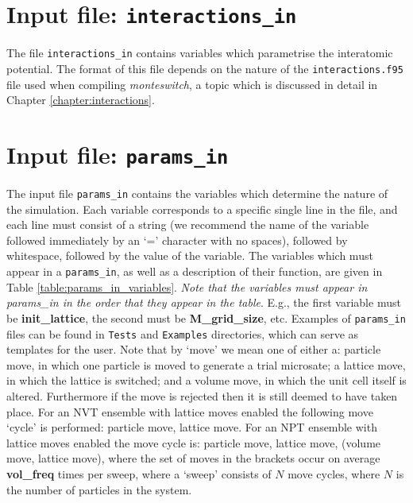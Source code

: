 \documentclass{report}
\begin{document}
\section{Input file: \texttt{interactions\_in}}
The file \texttt{interactions\_in} contains variables which parametrise the interatomic potential. The format of this file depends on
the nature of the \texttt{interactions.f95} file used when compiling \emph{monteswitch}, a topic which is discussed in detail in Chapter
\ref{chapter:interactions}.

\section{Input file: \texttt{params\_in}}\label{section:params_in}
The input file \texttt{params\_in} contains the variables which determine the nature of the simulation. Each variable corresponds to a
specific single line in the file, and each line must consist of a string (we recommend the name of the variable followed immediately
by an `=' character with no spaces), followed by whitespace, followed by the value of the variable. The variables which must appear
in a \texttt{params\_in}, as well as a description of their function, are given in Table \ref{table:params_in_variables}. 
\emph{Note that the variables must appear in params\_in in the order that they appear in the table}. E.g., the first 
variable must be \textbf{init\_lattice}, the second must be \textbf{M\_grid\_size}, etc. Examples of \texttt{params\_in} files can
be found in \texttt{Tests} and \texttt{Examples} directories, which can serve as templates for the user.
%
Note that by `move' we mean one of either a: particle move, in which one particle is moved to generate a trial microsate; a lattice move, in 
which the lattice is switched; and a volume move, in which the unit cell itself is altered. Furthermore if the move is rejected then it is 
still deemed to have taken place. For an NVT ensemble with lattice moves enabled the following move `cycle' is performed: particle move, 
lattice move. For an NPT ensemble with lattice moves enabled the move cycle is: particle move, lattice move, (volume move, lattice move), 
where the set of moves in the brackets occur on average \textbf{vol\_freq} times per sweep, where a `sweep' consists of $N$ move cycles,
where $N$ is the number of particles in the system.
\end{document}
